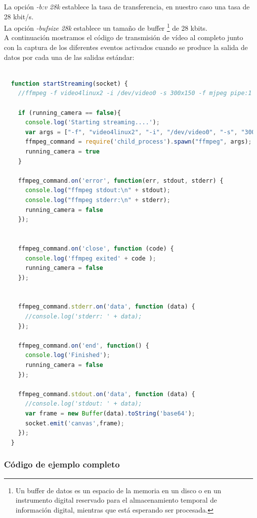 La opción \emph{-b:v 28k} establece la tasa de transferencia, en nuestro caso una tasa de 28 kbit/s.\\

La opción \emph{-bufsize 28k} establece un tamaño de buffer \footnote{Un buffer de datos es un espacio de la memoria en un disco o en un instrumento digital reservado para el almacenamiento
temporal de información digital, mientras que está esperando ser procesada.} de 28 kbits.\\

A continuación mostramos el código de transmisión de vídeo al completo junto con la captura de los diferentes eventos activados cuando se produce la salida de datos por cada una de las salidas estándar:\\

\begin{lstlisting}[language=JavaScript]

  function startStreaming(socket) {
    //ffmpeg -f video4linux2 -i /dev/video0 -s 300x150 -f mjpeg pipe:1 -b:v 28k -bufsize 28k

    if (running_camera == false){
      console.log('Starting streaming....');
      var args = ["-f", "video4linux2", "-i", "/dev/video0", "-s", "300x150","-f","mjpeg", "pipe:1", "-b:v 28k", "-bufsize 28k"]
      ffmpeg_command = require('child_process').spawn("ffmpeg", args);
      running_camera = true
    }

    ffmpeg_command.on('error', function(err, stdout, stderr) {
      console.log("ffmpeg stdout:\n" + stdout);
      console.log("ffmpeg stderr:\n" + stderr);
      running_camera = false
    });


    ffmpeg_command.on('close', function (code) {
      console.log('ffmpeg exited' + code );
      running_camera = false
    });


    ffmpeg_command.stderr.on('data', function (data) {
      //console.log('stderr: ' + data);
    });

    ffmpeg_command.on('end', function() {
      console.log('Finished');
      running_camera = false
    });

    ffmpeg_command.stdout.on('data', function (data) {
      //console.log('stdout: ' + data);
      var frame = new Buffer(data).toString('base64');
      socket.emit('canvas',frame);
    });
  }

\end{lstlisting}

\subsubsection{Código de ejemplo completo}

